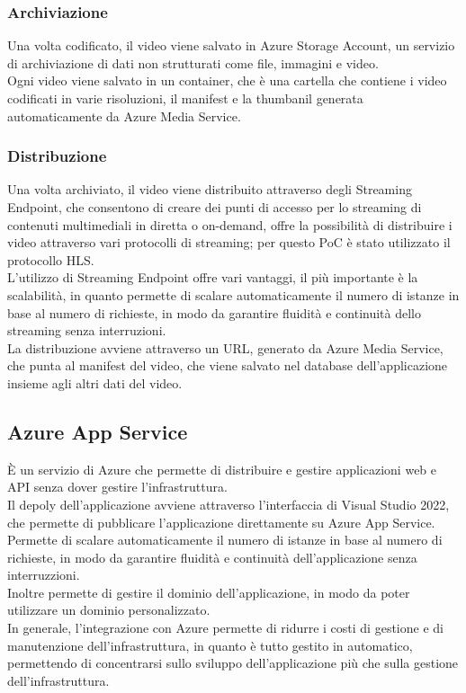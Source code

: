 \subsubsection{Archiviazione}
Una volta codificato, il video viene salvato in Azure Storage Account, un servizio di archiviazione di dati non strutturati come file, immagini e video.\\
Ogni video viene salvato in un container, che è una cartella che contiene i video codificati in varie risoluzioni, il manifest e la thumbanil generata automaticamente da Azure Media Service.\\

\subsubsection{Distribuzione}
Una volta archiviato, il video viene distribuito attraverso degli Streaming Endpoint, che consentono di creare dei punti di accesso per lo streaming di contenuti multimediali in diretta o on-demand, offre la possibilità di distribuire i video attraverso vari protocolli di streaming; per questo PoC è stato utilizzato il protocollo HLS.\\
L'utilizzo di Streaming Endpoint offre vari vantaggi, il più importante è la scalabilità, in quanto permette di scalare automaticamente il numero di istanze in base al numero di richieste, in modo da garantire fluidità e continuità dello streaming senza interruzioni.\\
La distribuzione avviene attraverso un URL, generato da Azure Media Service, che punta al manifest del video, che viene salvato nel database dell'applicazione insieme agli altri dati del video.\\


\subsection{Azure App Service}
È un servizio di Azure che permette di distribuire e gestire applicazioni web e API senza dover gestire l'infrastruttura.\\
Il depoly dell'applicazione avviene attraverso l'interfaccia di Visual Studio 2022, che permette di pubblicare l'applicazione direttamente su Azure App Service.\\
Permette di scalare automaticamente il numero di istanze in base al numero di richieste, in modo da garantire fluidità e continuità dell'applicazione senza interruzzioni.\\
Inoltre permette di gestire il dominio dell'applicazione, in modo da poter utilizzare un dominio personalizzato.\\

In generale, l'integrazione con Azure permette di ridurre i costi di gestione e di manutenzione dell'infrastruttura, in quanto è tutto gestito in automatico, permettendo di concentrarsi sullo sviluppo dell'applicazione più che sulla gestione dell'infrastruttura.\\